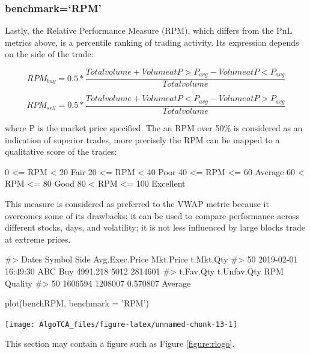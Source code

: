 \hypertarget{benchmarkrpm}{%
\subsubsection{benchmark=`RPM'}\label{benchmarkrpm}}

Lastly, the Relative Performance Measure (RPM), which differs from the
PnL metrics above, is a percentile ranking of trading activity. Its
expression depends on the side of the trade:

\[ RPM_{buy} = 0.5 * \frac{Total volume + Volume at P > P_{avg} - Volume at P < P_{avg}}{Total volume} \]

\[ RPM_{sell} = 0.5 * \frac{Total volume + Volume at P < P_{avg} - Volume at P > P_{avg}}{Total volume} \]

where P is the market price specified. The an RPM over 50\% is
considered as an indication of superior trades, more precisely the RPM
can be mapped to a qualitative score of the trades:

0 \textless{}= RPM \textless{} 20 Fair 20 \textless{}= RPM \textless{}
40 Poor 40 \textless{}= RPM \textless{}= 60 Average 60 \textless{} RPM
\textless{}= 80 Good 80 \textless{} RPM \textless{}= 100 Excellent

This measure is considered as preferred to the VWAP metric because it
overcomes some of its drawbacks: it can be used to compare performance
across different stocks, days, and volatility; it is not less influenced
by large blocks trade at extreme prices.

\begin{Schunk}
\begin{Soutput}
#>                  Dates Symbol Side Avg.Exec.Price Mkt.Price t.Mkt.Qty
#> 50 2019-02-01 16:49:30    ABC  Buy       4991.218      5012   2814601
#>    t.Fav.Qty t.Unfav.Qty      RPM Quality
#> 50   1606594     1208007 0.570807 Average
\end{Soutput}
\begin{Sinput}
plot(benchRPM, benchmark = 'RPM')
\end{Sinput}

\texttt{[image: AlgoTCA\_files/figure-latex/unnamed-chunk-13-1]} \end{Schunk}

This section may contain a figure such as Figure \ref{figure:rlogo}.

